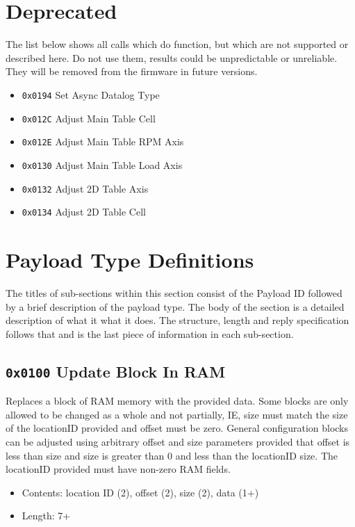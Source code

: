 \documentclass[12pt,a4paper,titlepage]{article}
\begin{document}
\begin{titlepage}
\begin{center}
\section{Deprecated}

The list below shows all calls which do function, but which are not supported or described here. Do not use them, results could be unpredictable or unreliable. They will be removed from the firmware in future versions.

\begin{itemize}
\item \texttt{0x0194} Set Async Datalog Type
\item \texttt{0x012C} Adjust Main Table Cell
\item \texttt{0x012E} Adjust Main Table RPM Axis
\item \texttt{0x0130} Adjust Main Table Load Axis
\item \texttt{0x0132} Adjust 2D Table Axis
\item \texttt{0x0134} Adjust 2D Table Cell
\end{itemize}




\newpage
\section {Payload Type Definitions}

The titles of sub-sections within this section consist of the Payload ID followed by a brief description of the payload type. The body of the section is a detailed description of what it what it does. The structure, length and reply specification follows that and is the last piece of information in each sub-section.


\subsection{\texttt{0x0100} Update Block In RAM}

Replaces a block of RAM memory with the provided data. Some blocks are only allowed to be changed as a whole and not partially, IE, size must match the size of the locationID provided and offset must be zero. General configuration blocks can be adjusted using arbitrary offset and size parameters provided that offset is less than size and size is greater than 0 and less than the locationID size. The locationID provided must have non-zero RAM fields.

\begin{itemize}
\item Contents: location ID (2),  offset (2), size (2), data (1+)
\item Length: 7+
\end{itemize}



\end{center}
\end{titlepage}
\end{document}
